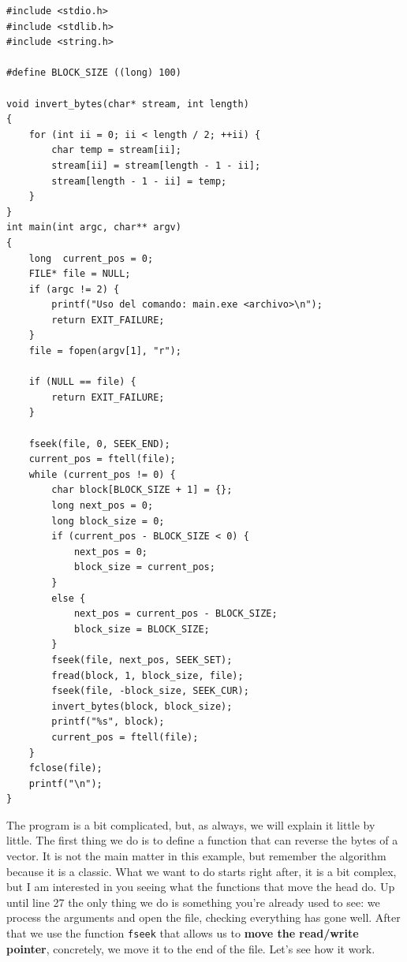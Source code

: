 \documentclass[a4paper]{article}
\begin{document}
\noindent
\begin{minipage}[H]{\linewidth}
\mbox{}
\begin{lstlisting}[style=C,
caption={Example of use of functions to move the read/write pointer},
label={lst:fseek}]
#include <stdio.h>
#include <stdlib.h>
#include <string.h>

#define BLOCK_SIZE ((long) 100)

void invert_bytes(char* stream, int length)
{
    for (int ii = 0; ii < length / 2; ++ii) {
        char temp = stream[ii];
        stream[ii] = stream[length - 1 - ii];
        stream[length - 1 - ii] = temp;
    }
}
int main(int argc, char** argv)
{
    long  current_pos = 0;
    FILE* file = NULL;
    if (argc != 2) {
        printf("Uso del comando: main.exe <archivo>\n");
        return EXIT_FAILURE;
    }
    file = fopen(argv[1], "r");

    if (NULL == file) {
        return EXIT_FAILURE;
    }

    fseek(file, 0, SEEK_END);
    current_pos = ftell(file);
    while (current_pos != 0) {
        char block[BLOCK_SIZE + 1] = {};
        long next_pos = 0;
        long block_size = 0;
        if (current_pos - BLOCK_SIZE < 0) {
            next_pos = 0;
            block_size = current_pos;
        }
        else {
            next_pos = current_pos - BLOCK_SIZE;
            block_size = BLOCK_SIZE;
        }
        fseek(file, next_pos, SEEK_SET);
        fread(block, 1, block_size, file);
        fseek(file, -block_size, SEEK_CUR);
        invert_bytes(block, block_size);
        printf("%s", block);
        current_pos = ftell(file);
    }
    fclose(file);
    printf("\n");
}
\end{lstlisting}
\end{minipage}

The program is a bit complicated, but, as always, we will explain it little
by little. The first thing we do is to define a function that can reverse the
bytes of a vector. It is not the main matter in this example, but remember the
algorithm because it is a classic. What we want to do starts right after, it is
a bit complex, but I am interested in you seeing what the functions that move
the head do. Up until line 27 the only thing we do is something you're already
used to see: we process the arguments and open the file, checking everything has
gone well. After that we use the function \verb!fseek! that allows us to
\textbf{move the read/write pointer}, concretely, we move it to the end of the
file. Let's see how it work.
\end{document}
